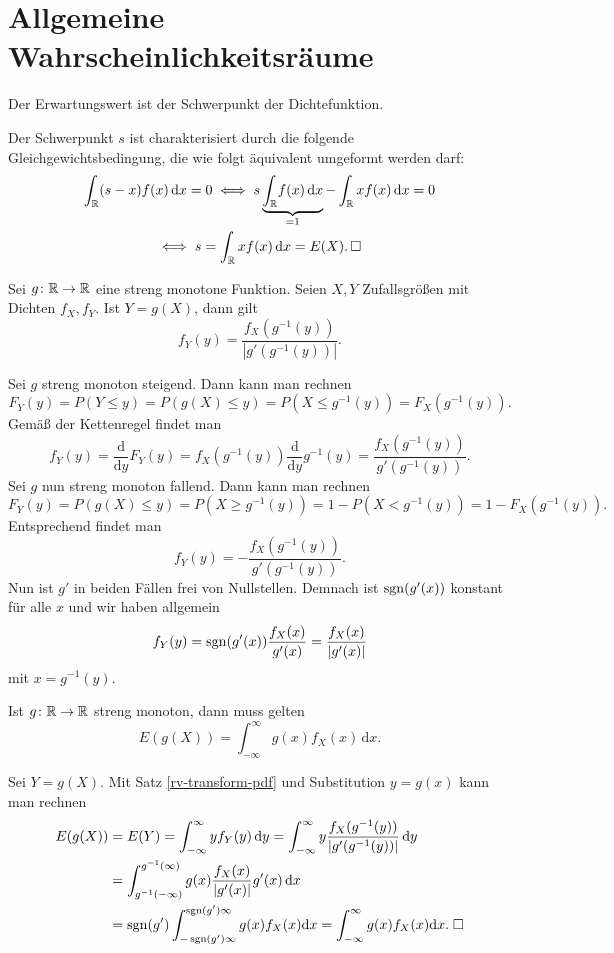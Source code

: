\section{Allgemeine Wahrscheinlichkeitsräume}

\begin{Satz}
Der Erwartungswert ist der Schwerpunkt der Dichtefunktion.
\end{Satz}
\begin{Beweis} Der Schwerpunkt $s$ ist charakterisiert durch die
folgende Gleichgewichtsbedingung, die wie folgt äquivalent
umgeformt werden darf:
\begin{gather*}
\int_\mathbb R (s-x)f(x)\,\mathrm dx = 0
\iff s\underbrace{\int_\mathbb R\! f(x)\,\mathrm dx}_{=1}
- \int_\mathbb R xf(x)\,\mathrm dx = 0\\
\iff s = \int_\mathbb R xf(x)\,\mathrm dx = E(X).\,\square
\end{gather*}
\end{Beweis}

\begin{Satz}\label{rv-transform-pdf}
Sei $g\colon\mathbb R\to\mathbb R$ eine streng monotone Funktion. Seien
$X,Y$ Zufallsgrößen mit Dichten $f_X,f_Y$. Ist $Y=g(X)$,
dann gilt
\[f_Y(y) = \frac{f_X(g^{-1}(y))}{|g'(g^{-1}(y))|}.\]
\end{Satz}
 Sei $g$ streng monoton steigend. Dann kann man rechnen
\[F_Y(y) = P(Y\le y) = P(g(X)\le y) = P(X\le g^{-1}(y)) = F_X(g^{-1}(y)).\]
Gemäß der Kettenregel findet man
\[f_Y(y) = \frac{\mathrm d}{\mathrm dy}F_Y(y)
= f_X(g^{-1}(y))\frac{\mathrm d}{\mathrm dy}g^{-1}(y) = \frac{f_X(g^{-1}(y))}{g'(g^{-1}(y))}.\]
Sei $g$ nun streng monoton fallend. Dann kann man rechnen
\[F_Y(y) = P(g(X)\le y) = P(X\ge g^{-1}(y)) = 1 - P(X < g^{-1}(y))
= 1 - F_X(g^{-1}(y)).\]
Entsprechend findet man
\[f_Y(y) = -\frac{f_X(g^{-1}(y))}{g'(g^{-1}(y))}.\]
Nun ist $g'$ in beiden Fällen frei von Nullstellen. Demnach ist
$\operatorname{sgn}(g'(x))$ konstant für alle $x$ und wir haben allgemein
\[f_Y(y) = \operatorname{sgn}(g'(x))\frac{f_X(x)}{g'(x)} = \frac{f_X(x)}{|g'(x)|}\]
mit $x=g^{-1}(y)$.\;\qedsymbol

\begin{Satz}\newlinefirst
Ist $g\colon\mathbb R\to\mathbb R$ streng monoton, dann muss gelten
\[E(g(X)) = \int_{-\infty}^\infty g(x)f_X(x)\,\mathrm dx.\]
\end{Satz}
 Sei $Y=g(X)$. Mit Satz \ref{rv-transform-pdf}
und Substitution $y=g(x)$ kann man rechnen
\begin{align*}
E(g(X)) &= E(Y) = \int_{-\infty}^\infty yf_Y(y)\,\mathrm dy
= \int_{-\infty}^\infty y\frac{f_X(g^{-1}(y))}{|g'(g^{-1}(y))|}\,\mathrm dy\\
&= \int_{g^{-1}(-\infty)}^{g^{-1}(\infty)} g(x)
\frac{f_X(x)}{|g'(x)|}g'(x)\,\mathrm dx\\
&= \operatorname{sgn}(g')\int_{-\operatorname{sgn}(g')\infty}^{\operatorname{sgn}(g')\infty}g(x) f_X(x)\mathrm dx
= \int_{-\infty}^\infty g(x) f_X(x)\mathrm dx.\;\square
\end{align*}

